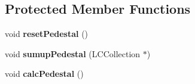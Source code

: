 \subsection*{Protected Member Functions}
\begin{DoxyCompactItemize}
\item 
void {\bfseries reset\-Pedestal} ()\label{classCALICE_1_1SimpleHcalCalibrationProcessor_aadf1394fe327966a3699ff0bbdfc2142}

\item 
void {\bfseries sumup\-Pedestal} (L\-C\-Collection $\ast$)\label{classCALICE_1_1SimpleHcalCalibrationProcessor_ab943f16a6b695d16f806a5d91f4c8176}

\item 
void {\bfseries calc\-Pedestal} ()\label{classCALICE_1_1SimpleHcalCalibrationProcessor_aec0a7d9911db467b754a4ab79060868b}

\end{DoxyCompactItemize}
